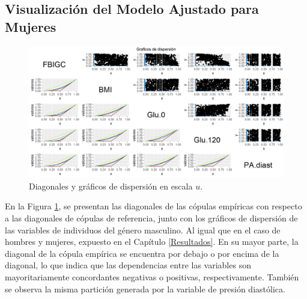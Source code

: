 
\begin{landscape}
\subsection{Visualización del Modelo Ajustado para Mujeres}

\begin{figure}[H]
    \centering
    \includegraphics[height = 13.5 cm, width = 1.4 \textwidth]{4img/UdiagM.png}
    \caption{Diagonales y gráficos de dispersión en escala $u$.}
    \label{fig:diagMU}
\end{figure}
\end{landscape}

En la Figura \ref{fig:diagMU}, se presentan las diagonales de las cópulas empíricas con respecto a las diagonales de cópulas de referencia, junto con los gráficos de dispersión de las variables de individuos del género masculino. Al igual que en el caso de hombres y mujeres, expuesto en el Capítulo \ref{Resultados}. En su mayor parte, la diagonal de la cópula empírica se encuentra por debajo o por encima de la diagonal, lo que indica que las dependencias entre las variables son mayoritariamente concordantes negativas o positivas, respectivamente. También se observa la misma partición generada por la variable de presión diastólica.



